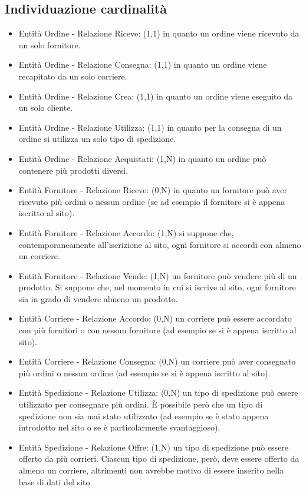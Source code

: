 \subsection{Individuazione cardinalità}
\begin{itemize}
	\item Entità Ordine - Relazione Riceve: (1,1) in quanto un ordine viene ricevuto da un solo fornitore.
	\item Entità Ordine - Relazione Consegna: (1,1) in quanto un ordine viene recapitato da un solo corriere.
	\item Entità Ordine - Relazione Crea: (1,1) in quanto un ordine viene eseguito da un solo cliente.
	\item Entità Ordine - Relazione Utilizza: (1,1) in quanto per la consegna di un ordine si utilizza un solo tipo di spedizione.
	\item Entità Ordine - Relazione Acquistati: (1,N) in quanto un ordine può contenere più prodotti diversi.
	\item Entità Fornitore - Relazione Riceve: (0,N) in quanto un fornitore può aver ricevuto più ordini o nessun ordine (se ad esempio il fornitore si è appena iscritto al sito).
	\item Entità Fornitore - Relazione Accordo: (1,N) si suppone che, contemporaneamente all’iscrizione al sito, ogni fornitore si accordi con almeno un
	corriere.
	\item Entità Fornitore - Relazione Vende: (1,N) un fornitore può vendere più di un prodotto. Si suppone che, nel momento in cui si iscrive al sito, ogni fornitore sia in grado di vendere almeno un prodotto.
	\item Entità Corriere - Relazione Accordo: (0,N) un corriere può essere accordato con più fornitori o con nessun fornitore (ad esempio se si è appena iscritto al sito).
	\item Entità Corriere - Relazione Consegna: (0,N) un corriere può aver consegnato più ordini o nessun ordine (ad esempio se si è appena iscritto al sito).
	\item Entità Spedizione - Relazione Utilizza: (0,N) un tipo di spedizione può essere utilizzato per consegnare più ordini. È possibile però che un tipo di spedizione non sia mai stato utilizzato (ad esempio se è stato appena introdotto nel sito o se è particolarmente svantaggioso).
	\item Entità Spedizione - Relazione Offre: (1,N) un tipo di spedizione può essere offerto da più corrieri. Ciascun tipo di spedizione, però, deve essere offerto da almeno un corriere, altrimenti non avrebbe motivo di essere inserito nella base di dati del sito

\end{itemize}

